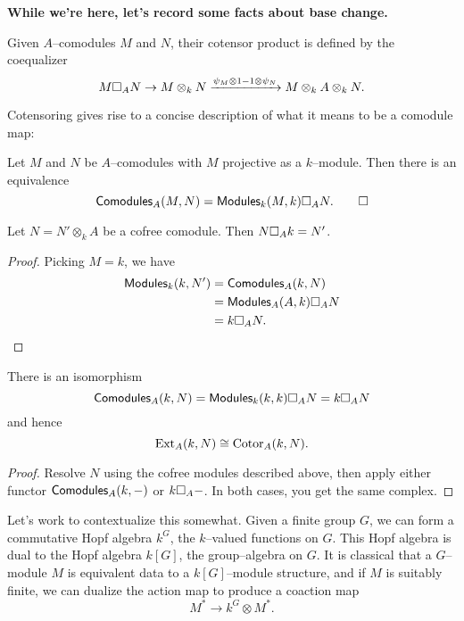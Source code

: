 \textbf{While we're here, let's record some facts about base change.}

\begin{definition}
Given $A$--comodules $M$ and $N$, their cotensor product is defined by the coequalizer \[M \square_A N \to M \otimes_k N \xrightarrow{\psi_M \otimes 1 - 1 \otimes \psi_N} M \otimes_k A \otimes_k N.\]
\end{definition}

\noindent Cotensoring gives rise to a concise description of what it means to be a comodule map:

\begin{lemma}
Let $M$ and $N$ be $A$--comodules with $M$ projective as a $k$--module.  Then there is an equivalence \[\mathsf{Comodules}_A(M, N) = \mathsf{Modules}_k(M, k) \square_A N. \qed\]
\end{lemma}

\begin{corollary}
Let $N = N' \otimes_k A$ be a cofree comodule. Then $N \square_A k = N'$.
\end{corollary}
\begin{proof}
Picking $M = k$, we have
\begin{align*}
\mathsf{Modules}_k(k, N') & = \mathsf{Comodules}_A(k, N) \\
& = \mathsf{Modules}_A(A, k) \square_A N \\
& = k \square_A N. \qedhere
\end{align*}
\end{proof}

\begin{corollary}
There is an isomorphism \[\mathsf{Comodules}_A(k, N) = \mathsf{Modules}_k(k, k) \square_A N = k \square_A N\] and hence \[\operatorname{Ext}_A(k, N) \cong \operatorname{Cotor}_A(k, N).\]
\end{corollary}
\begin{proof}
Resolve $N$ using the cofree modules described above, then apply either functor $\mathsf{Comodules}_A(k, -)$ or $k \square_A -$.  In both cases, you get the same complex.
\end{proof}


\begin{example}
Let's work to contextualize this somewhat.  Given a finite group $G$, we can form a commutative Hopf algebra $k^G$, the $k$--valued functions on $G$.  This Hopf algebra is dual to the Hopf algebra $k[G]$, the group--algebra on $G$.  It is classical that a $G$--module $M$ is equivalent data to a $k[G]$--module structure, and if $M$ is suitably finite, we can dualize the action map to produce a coaction map \[M^* \to k^G \otimes M^*.\]  
\end{example}


